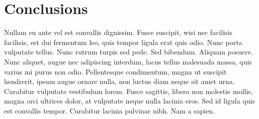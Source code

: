 \documentclass{article}
\begin{document}
\begin{table}[h]
  \label{tab:table_01}
  \centering
  \begin{tabular}{*{6}{c}}

  \end{tabular}
  \caption{}
\end{table}


\section{Conclusions}
\label{sec:conclusion}

Nullam eu ante vel est convallis dignissim. Fusce suscipit, wisi nec
facilisis facilisis, est dui fermentum leo, quis tempor ligula erat
quis odio. Nunc porta vulputate tellus. Nunc rutrum turpis sed
pede. Sed bibendum. Aliquam posuere. Nunc aliquet, augue nec
adipiscing interdum, lacus tellus malesuada massa, quis varius mi
purus non odio. Pellentesque condimentum, magna ut suscipit hendrerit,
ipsum augue ornare nulla, non luctus diam neque sit amet
urna. Curabitur vulputate vestibulum lorem. Fusce sagittis, libero non
molestie mollis, magna orci ultrices dolor, at vulputate neque nulla
lacinia eros. Sed id ligula quis est convallis tempor. Curabitur
lacinia pulvinar nibh. Nam a sapien.
\end{document}
